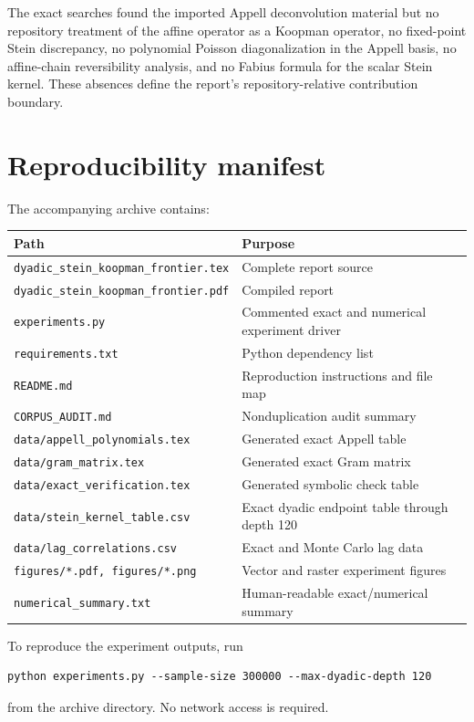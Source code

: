 \documentclass[11pt,a4paper]{article}
\theoremstyle{definition}
\theoremstyle{remark}
\begin{document}
The exact searches found the imported Appell deconvolution material but no repository treatment of the affine operator as a Koopman operator, no fixed-point Stein discrepancy, no polynomial Poisson diagonalization in the Appell basis, no affine-chain reversibility analysis, and no Fabius formula for the scalar Stein kernel. These absences define the report's repository-relative contribution boundary.

\section{Reproducibility manifest}
\label{app:reproducibility}

The accompanying archive contains:
\begin{center}
\begin{tabularx}{0.94\textwidth}{@{}lX@{}}
\toprule
Path & Purpose \\
\midrule
\texttt{dyadic\_stein\_koopman\_frontier.tex} & Complete report source \\
\texttt{dyadic\_stein\_koopman\_frontier.pdf} & Compiled report \\
\texttt{experiments.py} & Commented exact and numerical experiment driver \\
\texttt{requirements.txt} & Python dependency list \\
\texttt{README.md} & Reproduction instructions and file map \\
\texttt{CORPUS\_AUDIT.md} & Nonduplication audit summary \\
\texttt{data/appell\_polynomials.tex} & Generated exact Appell table \\
\texttt{data/gram\_matrix.tex} & Generated exact Gram matrix \\
\texttt{data/exact\_verification.tex} & Generated symbolic check table \\
\texttt{data/stein\_kernel\_table.csv} & Exact dyadic endpoint table through depth 120 \\
\texttt{data/lag\_correlations.csv} & Exact and Monte Carlo lag data \\
\texttt{figures/*.pdf, figures/*.png} & Vector and raster experiment figures \\
\texttt{numerical\_summary.txt} & Human-readable exact/numerical summary \\
\bottomrule
\end{tabularx}
\end{center}

To reproduce the experiment outputs, run
\begin{verbatim}
python experiments.py --sample-size 300000 --max-dyadic-depth 120
\end{verbatim}
from the archive directory. No network access is required.
\end{document}
